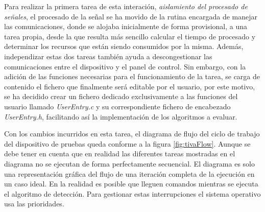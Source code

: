         Para realizar la primera tarea de esta interación, \textit{aislamiento del procesado de señales}, el procesado de la señal se ha movido de la rutina encargada de manejar las comunicaciones, donde se alojaba inicialmente de forma provisional, a una tarea propia, desde la que resulta más sencillo calcular el tiempo de procesado y determinar los recursos que están siendo consumidos por la misma. Además, independizar estas dos tareas también ayuda a descongestionar las comunicaciones entre el dispositivo y el panel de control. Sin embargo, con la adición de las funciones necesarias para el funcionamiento de la tarea, se carga de contenido el fichero que finalmente será editable por el usuario, por este motivo, se ha decidido crear un fichero dedicado exclusivamente a las funciones del usuario llamado \textit{UserEntry.c} y su correspondiente fichero de encabezado \textit{UserEntry.h}, facilitando así la implementación de los algoritmos a evaluar. 
        
        Con los cambios incurridos en esta tarea, el diagrama de flujo del ciclo de trabajo del dispositivo de pruebas queda conforme a la figura \ref{fig:tivaFlow}. Aunque se debe tener en cuenta que en realidad las diferentes tareas mostradas en el diagrama no se ejecutan de forma perfectamente secuencial. El diagrama es solo una representación gráfica del flujo de una iteración completa de la ejecución en un caso ideal. En la realidad es posible que lleguen comandos mientras se ejecuta el algoritmo de detección. Para gestionar estas interrupciones el sistema operativo usa las prioridades.
        
